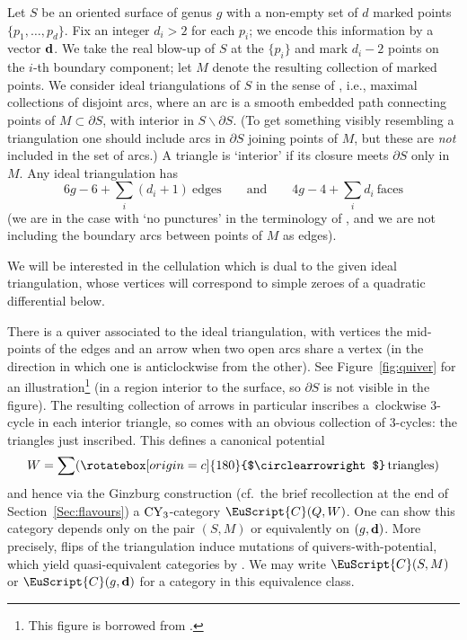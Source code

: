 \documentclass[pdftex]{sigma}
\newcommand{\scrC}{\EuScript{C}}
\def\Circlearrowright{\ensuremath{%
 \rotatebox[origin=c]{180}{$\circlearrowright$}}}
\theoremstyle{definition}
\numberwithin{equation}{section}
\begin{document}
Let $S$ be an oriented surface of genus $g$ with a non-empty set of $d$ marked points $\{p_1,\dots,p_d\}$. Fix an integer $d_i > 2$ for each $p_i$; we encode this information by a vector $\bf{d}$. We take the real blow-up of $S$ at the $\{p_i\}$ and mark $d_i-2$ points on the $i$-th boundary component; let $M$ denote the resulting collection of marked points. We consider ideal triangulations of $S$ in the sense of \cite{FST}, i.e., maximal collections of disjoint arcs, where an arc is a smooth embedded path connecting points of $M \subset \partial S$, with interior in $S \backslash \partial S$. (To get something visibly resembling a triangulation one should include arcs in $\partial S$ joining points of $M$, but these are \emph{not} included in the set of arcs.) A triangle is `interior' if its closure meets $\partial S$ only in $M$. Any ideal triangulation has
\begin{equation} \label{eqn:edges and faces}
6g-6+ \sum_i (d_i+1) \ \mathrm{edges} \qquad \mathrm{and} \qquad 4g-4+\sum_i d_i \ \mathrm{faces}
\end{equation}
(we are in the case with `no punctures' in the terminology of \cite{BS}, and we are not including the boundary arcs between points of $M$ as edges).

We will be interested in the cellulation which is dual to the given ideal triangulation, whose vertices will correspond to simple zeroes of a quadratic differential below.

There is a quiver associated to the ideal triangulation, with vertices the mid-points of the edges and an arrow when two open arcs share a vertex (in the direction in which one is anticlockwise from the other). See Figure~\ref{fig:quiver} for an illustration\footnote{This figure is borrowed from \cite{BS}.} (in a region interior to the surface, so $\partial S$ is not visible in the figure).
The resulting collection of arrows in particular inscribes a~clockwise 3-cycle in each interior triangle, so comes with an obvious collection of $3$-cycles: the triangles just inscribed. This defines a canonical potential
\[
W =\sum (\Circlearrowright \, \mathrm{triangles})
\]
and hence via the Ginzburg construction (cf.~the brief recollection at the end of Section~\ref{Sec:flavours}) a ${\rm CY}_3$-category $\scrC(Q,W) $. One can show this category depends only on the pair $(S,M)$ or equivalently on $(g,\bf{d})$. More precisely, flips of the triangulation induce mutations of quivers-with-potential, which yield quasi-equivalent categories by \cite{Keller-Yang}. We may write $\scrC(S,M)$ or $\scrC(g,\mathbf{d})$ for a category in this equivalence class.
\end{document}
